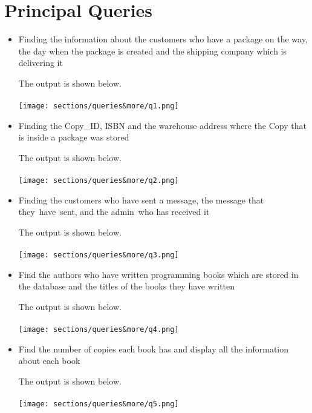 \section{Principal Queries}



\begin{itemize}
\item Finding the information about the customers who have a package on the way, the day when the package is created and the shipping company which is delivering it

The output is shown below.\\ 
\vspace{0.2cm}\\
\texttt{[image: sections/queries\&more/q1.png]}

\item Finding the Copy{\_}ID, ISBN and the warehouse address where the Copy that is inside a package was stored

The output is shown below.\\ 
\vspace{0.2cm}\\
\texttt{[image: sections/queries\&more/q2.png]}

\item Finding the customers who have sent a message, the message that they have sent, and the admin who has received it

The output is shown below.\\ 
\vspace{0.2cm}\\
\texttt{[image: sections/queries\&more/q3.png]}

\item Find the authors who have written programming books which are stored in the database and the titles of the books they have written

The output is shown below.\\ 
\vspace{0.2cm}\\
\texttt{[image: sections/queries\&more/q4.png]}

\item Find the number of copies each book has and display all the information about each book

The output is shown below.\\ 
\vspace{0.2cm}\\
\texttt{[image: sections/queries\&more/q5.png]}
\end{itemize}